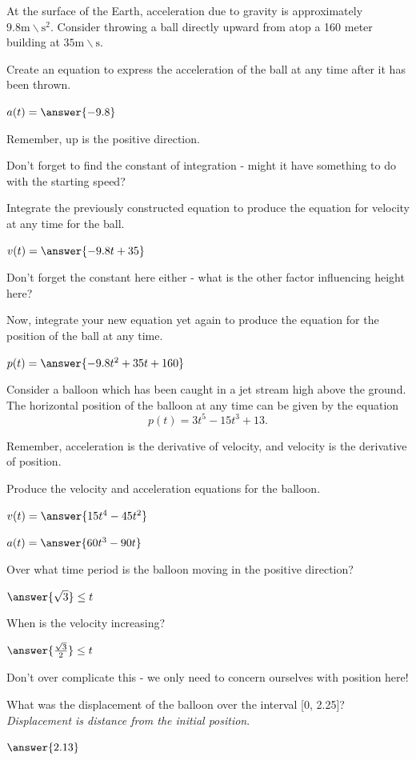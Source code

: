 \documentclass{ximera}
\begin{document}
\begin{question}
At the surface of the Earth, acceleration due to gravity is approximately $9.8 \text{m} \backslash \text{s}^2$. Consider throwing a ball directly upward from atop a 160 meter building at $35 \text{m}\backslash \text{s}$.

Create an equation to express the acceleration of the ball at any time after it has been thrown.

$a(t) = \answer{-9.8}$
\begin{feedback}
Remember, up is the positive direction.
\end{feedback}

\begin{hint}
Don't forget to find the constant of integration - might it have something to do with the starting speed?
\end{hint}
Integrate the previously constructed equation to produce the equation for velocity at any time for the ball.

$v(t) = \answer{-9.8t+35}$

\begin{hint}
Don't forget the constant here either - what is the other factor influencing height here?
\end{hint}
Now, integrate your new equation yet again to produce the equation for the position of the ball at any time.

$p(t) = \answer{-9.8t^2+35t+160}$
\end{question}
\begin{question}
Consider a balloon which has been caught in a jet stream high above the ground. The horizontal position of the balloon at any time can be given by the equation $$p(t) = 3t^5-15t^3+13\text{.}$$

\begin{hint}
Remember, acceleration is the derivative of velocity, and velocity is the derivative of position.
\end{hint}
Produce the velocity and acceleration equations for the balloon.

$v(t) = \answer{15t^4-45t^2}$

$a(t) = \answer{60t^3-90t}$

Over what time period is the balloon moving in the positive direction?

$\answer{\sqrt{3}} \leq t$

When is the velocity increasing?

$\answer{\frac{\sqrt{3}}{2}} \leq t$

\begin{hint}
Don't over complicate this - we only need to concern ourselves with position here!
\end{hint}
What was the displacement of the balloon over the interval [0, 2.25]? \textit{Displacement is distance from the initial position}.

$\answer{2.13}$
\end{question}
\end{document}
